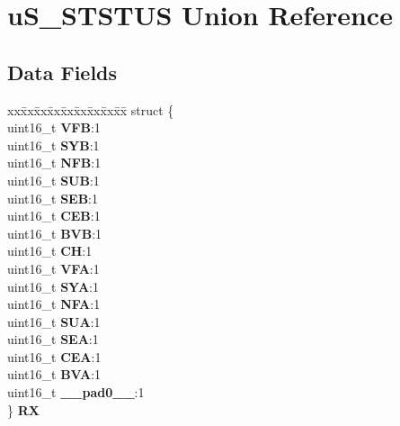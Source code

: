 \hypertarget{unionuS__STSTUS}{}\section{u\+S\+\_\+\+S\+T\+S\+T\+US Union Reference}
\label{unionuS__STSTUS}
\subsection*{Data Fields}
\begin{DoxyCompactItemize}
\item 
\mbox{\label{unionuS__STSTUS_a383e3c4157b224c9381755c5da5820b8}} 
\begin{tabbing}
xx\=xx\=xx\=xx\=xx\=xx\=xx\=xx\=xx\=\kill
struct \{\\
\>uint16\_t {\bfseries VFB}:1\\
\>uint16\_t {\bfseries SYB}:1\\
\>uint16\_t {\bfseries NFB}:1\\
\>uint16\_t {\bfseries SUB}:1\\
\>uint16\_t {\bfseries SEB}:1\\
\>uint16\_t {\bfseries CEB}:1\\
\>uint16\_t {\bfseries BVB}:1\\
\>uint16\_t {\bfseries CH}:1\\
\>uint16\_t {\bfseries VFA}:1\\
\>uint16\_t {\bfseries SYA}:1\\
\>uint16\_t {\bfseries NFA}:1\\
\>uint16\_t {\bfseries SUA}:1\\
\>uint16\_t {\bfseries SEA}:1\\
\>uint16\_t {\bfseries CEA}:1\\
\>uint16\_t {\bfseries BVA}:1\\
\>uint16\_t {\bfseries \_\_pad0\_\_}:1\\
\} {\bfseries RX}\\


\end{tabbing}
\end{DoxyCompactItemize}

